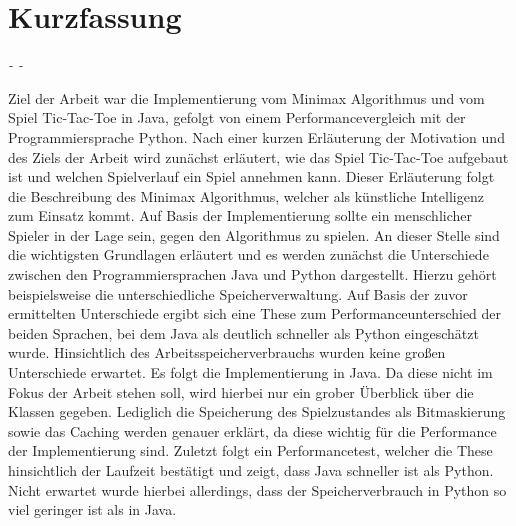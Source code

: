 \chapter*{Kurzfassung}

\begin{flushright}
    \textit{\DerAutorDerArbeit - \DieMatrikelnummer - \DieKursbezeichnung}
\end{flushright}

\textbf{\DerTitelDerArbeit}

Ziel der Arbeit war die Implementierung vom Minimax Algorithmus und vom Spiel Tic-Tac-Toe in Java,
gefolgt von einem Performancevergleich mit der Programmiersprache Python. Nach einer kurzen Erläuterung
der Motivation und des Ziels der Arbeit wird zunächst erläutert, wie das Spiel Tic-Tac-Toe
aufgebaut ist und welchen Spielverlauf ein Spiel annehmen kann. Dieser Erläuterung folgt die
Beschreibung des Minimax Algorithmus, welcher als künstliche Intelligenz zum Einsatz kommt.
Auf Basis der Implementierung sollte ein menschlicher Spieler in der Lage sein, gegen den
Algorithmus zu spielen. An dieser Stelle sind die wichtigsten Grundlagen erläutert und es werden 
zunächst die Unterschiede zwischen den Programmiersprachen Java und Python dargestellt. Hierzu gehört
beispielsweise die unterschiedliche Speicherverwaltung. Auf Basis der zuvor ermittelten Unterschiede
ergibt sich eine These zum Performanceunterschied der beiden Sprachen, bei dem Java als deutlich 
schneller als Python eingeschätzt wurde. Hinsichtlich des Arbeitsspeicherverbrauchs wurden keine großen Unterschiede erwartet.  
Es folgt die Implementierung in Java. Da diese nicht im Fokus der Arbeit stehen soll, wird hierbei nur ein grober Überblick über die 
Klassen gegeben. Lediglich die Speicherung des Spielzustandes als Bitmaskierung sowie das Caching werden
genauer erklärt, da diese wichtig für die Performance der Implementierung sind. Zuletzt folgt ein
Performancetest, welcher die These hinsichtlich der Laufzeit bestätigt und zeigt, dass Java schneller ist als
Python. Nicht erwartet wurde hierbei allerdings, dass der Speicherverbrauch in Python so viel geringer 
ist als in Java.